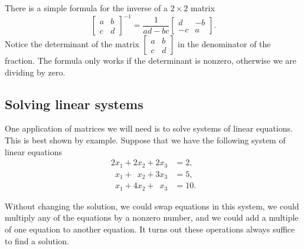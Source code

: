 \documentclass{ximera}
\begin{document}
There is a simple formula for the inverse of a $2 \times 2$ matrix
\begin{equation*}
    \begin{bmatrix}
        a & b \\
        c & d
    \end{bmatrix}^{-1}
    = \frac{1}{ad-bc}
    \begin{bmatrix}
        d & -b \\
        -c & a
    \end{bmatrix} .
\end{equation*}
Notice the determinant of the matrix $[\begin{smallmatrix}a&b\\c&d\end{smallmatrix}]$ in the denominator of the fraction. The formula only works if the determinant is nonzero, otherwise we are dividing by zero.

\subsection{Solving linear systems}

One application of matrices we will need is to solve systems of linear equations.  This is best shown by example. Suppose that we have the following system of linear equations
\begin{align*}
              2 x_1 +           2 x_2 +           2 x_3 & = 2 , \\
    \phantom{9} x_1 + \phantom{9} x_2 +           3 x_3 & = 5 , \\
    \phantom{9} x_1 +           4 x_2 + \phantom{9} x_3 & = 10 .
\end{align*}

Without changing the solution, we could swap equations in this system, we could multiply any of the equations by a nonzero number, and we could add a multiple of one equation to another equation. It turns out these operations always suffice to find a solution.
\end{document}
